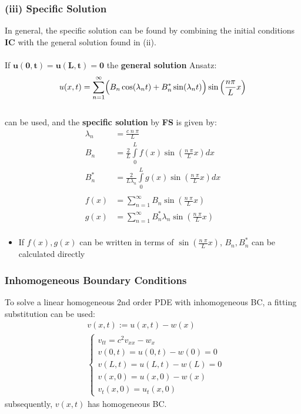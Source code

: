 \subsubsection{(iii) Specific Solution}\label{pde/1dwave/specificSolution}
In general, the specific solution can be found by combining the initial conditions \textbf{IC}
with the general solution found in (ii).\\\hbox{}\\
If $\mathbf{u(0,t)=u(L,t)= 0}$ the \textbf{general solution} Ansatz:
\begin{equation*}
    u(x,t)=\sum\limits_{n=1}^{\infty}
    \Bigl( B_n \cos(\lambda _n t)+B_n^* \sin(\lambda_n t)\Bigr) \sin
    \left(\frac{n \pi}{L}x \right)
\end{equation*}\\
can be used, and the \textbf{specific solution} by \textbf{FS} is given by:
\begin{align*}
    \lambda_n & =\frac{c\; n\; \pi}{L}                                               \\
    B_n       & =\frac{2}{L}\int\limits_0^L f(x)\sin(\frac{n\;\pi}{L}x)dx            \\
    B_n^*     & =\frac{2}{L\lambda_n} \int\limits_0^L g(x) \sin(\frac{n\;\pi}{L}x)dx \\\\
    f(x)      & =\sum\limits_{n=1}^{\infty} B_n \sin(\frac{n\;\pi}{L}x)              \\
    g(x)      & =\sum\limits_{n=1}^{\infty} B_n^* \lambda_n \sin(\frac{n\;\pi}{L}x)  \\
\end{align*}
\begin{itemize}
    \item If $f(x),g(x)$ can be written in terms of $\sin(\frac{n\;\pi}{L}x)$, $B_n, B_n^*$
          can be calculated directly
\end{itemize}

\subsubsection{Inhomogeneous Boundary Conditions}
To solve a linear homogeneous 2nd order PDE with inhomogeneous BC, a fitting substitution can be used:
\begin{align*}
     & v(x,t):= u(x,t) -w(x) \\
     & \begin{cases}
           v_{tt}=c^2v_{xx}-w_x \\
           v(0,t)=u(0,t)-w(0)=0 \\
           v(L,t)=u(L,t)-w(L)=0 \\
           v(x,0)=u(x,0)-w(x)   \\
           v_t(x,0)=u_t(x,0)
       \end{cases}
\end{align*}
subsequently, $v(x,t)$ has homogeneous BC.

